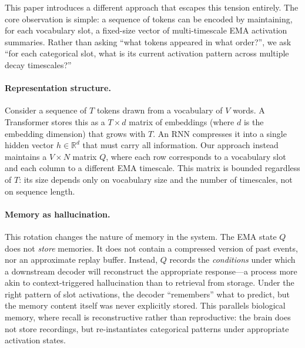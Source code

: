 \documentclass[11pt]{article}
\begin{document}
This paper introduces a different approach that escapes this tension entirely. The core observation is simple: a sequence of tokens can be encoded by maintaining, for each vocabulary slot, a fixed-size vector of multi-timescale EMA activation summaries. Rather than asking ``what tokens appeared in what order?'', we ask ``for each categorical slot, what is its current activation pattern across multiple decay timescales?''

\paragraph{Representation structure.}
Consider a sequence of $T$ tokens drawn from a vocabulary of $V$ words. A Transformer stores this as a $T \times d$ matrix of embeddings (where $d$ is the embedding dimension) that grows with $T$. An RNN compresses it into a single hidden vector $h \in \mathbb{R}^{d}$ that must carry all information. Our approach instead maintains a $V \times N$ matrix $Q$, where each row corresponds to a vocabulary slot and each column to a different EMA timescale. This matrix is bounded regardless of $T$: its size depends only on vocabulary size and the number of timescales, not on sequence length.

\paragraph{Memory as hallucination.}
This rotation changes the nature of memory in the system. The EMA state $Q$ does not \emph{store} memories. It does not contain a compressed version of past events, nor an approximate replay buffer. Instead, $Q$ records the \emph{conditions} under which a downstream decoder will reconstruct the appropriate response---a process more akin to context-triggered hallucination than to retrieval from storage. Under the right pattern of slot activations, the decoder ``remembers'' what to predict, but the memory content itself was never explicitly stored. This parallels biological memory, where recall is reconstructive rather than reproductive: the brain does not store recordings, but re-instantiates categorical patterns under appropriate activation states.
\end{document}
